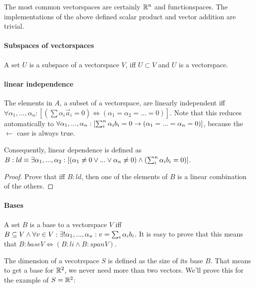 The most common vectorspaces are certainly $\mathbb{R}^n$ and functionspaces.
The implementations of the above defined scalar product and vector addition are trivial.







\paragraph{Subspaces of vectorspaces}
A set $U$ is a subspace of a vectorspace $V$, iff $U \subset V$ and $U$ is a vectorspace.








\paragraph{linear independence} 
The elements in $A$, a subset of a vectorspace, are linearly independent iff $\forall \alpha_1, ...,\alpha_n: [( \sum \alpha_i \vec{a}_i = 0 ) \iff ( \alpha_1 = \alpha_2 = ... = 0 )]$. Note that this reduces automatically to $\forall \alpha_1, ...,\alpha_n: [\sum_i^n \alpha_i b_i = 0 \to (\alpha_1 = ... = \alpha_n = 0)]$, because the $\leftarrow$ case is always true. 

Consequently, linear dependence is defined as $B:ld \equiv \exists \alpha_1, ..., \alpha_2: [(\alpha_1 \neq 0 \lor ... \lor \alpha_n \neq 0) \land ( \sum_i^n \alpha_i b_i = 0 )]$.


\begin{proof}
    Prove that iff $B:ld$, then one of the elements of $B$ is a linear combination of the others. 
\end{proof}








\paragraph{Bases}
A set $B$ is a base to a vectorspace $V$ iff $ B \subseteq V \land  \forall v \in V: \exists ! \alpha_1, ..., \alpha_n : v = \sum_i \alpha_i b_i $. It is easy to prove that this means that
$ B:baseV \iff ( B:li \land B:spanV ) $. 



The dimension of a vecotrspace $S$ is defined as the size of its base $B$. That means to get a base for $\mathbb{R}^2$, we never need more than two vectors. We'll prove this for the example of $S = \mathbb{R}^2$:


